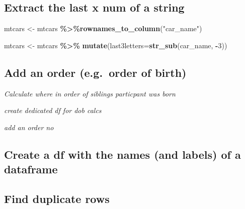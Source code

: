 \documentclass[
]{article}
\newenvironment{Shaded}{\begin{snugshade}}{\end{snugshade}}
\newcommand{\AttributeTok}[1]{\textcolor[rgb]{0.13,0.29,0.53}{#1}}
\newcommand{\CommentTok}[1]{\textcolor[rgb]{0.56,0.35,0.01}{\textit{#1}}}
\newcommand{\DecValTok}[1]{\textcolor[rgb]{0.00,0.00,0.81}{#1}}
\newcommand{\FunctionTok}[1]{\textcolor[rgb]{0.13,0.29,0.53}{\textbf{#1}}}
\newcommand{\NormalTok}[1]{#1}
\newcommand{\OtherTok}[1]{\textcolor[rgb]{0.56,0.35,0.01}{#1}}
\newcommand{\SpecialCharTok}[1]{\textcolor[rgb]{0.81,0.36,0.00}{\textbf{#1}}}
\newcommand{\StringTok}[1]{\textcolor[rgb]{0.31,0.60,0.02}{#1}}
\begin{document}
\hypertarget{extract-the-last-x-num-of-a-string}{%
\subsection{Extract the last x num of a string}\label{extract-the-last-x-num-of-a-string}}

\begin{Shaded}
\begin{Highlighting}[]
\NormalTok{mtcars }\OtherTok{\textless{}{-}}\NormalTok{ mtcars }\SpecialCharTok{\%\textgreater{}\%}\FunctionTok{rownames\_to\_column}\NormalTok{(}\StringTok{"car\_name"}\NormalTok{)}

\NormalTok{mtcars }\OtherTok{\textless{}{-}}\NormalTok{ mtcars }\SpecialCharTok{\%\textgreater{}\%} \FunctionTok{mutate}\NormalTok{(}\AttributeTok{last3letters=}\FunctionTok{str\_sub}\NormalTok{(car\_name, }\SpecialCharTok{{-}}\DecValTok{3}\NormalTok{))}
\end{Highlighting}
\end{Shaded}

\hypertarget{add-an-order-e.g.-order-of-birth}{%
\subsection{Add an order (e.g.~order of birth)}\label{add-an-order-e.g.-order-of-birth}}

\emph{Calculate where in order of siblings particpant was born}

\emph{create dedicated df for dob calcs}

\emph{add an order no}

\hypertarget{create-a-df-with-the-names-and-labels-of-a-dataframe}{%
\subsection{Create a df with the names (and labels) of a dataframe}\label{create-a-df-with-the-names-and-labels-of-a-dataframe}}

\hypertarget{find-duplicate-rows}{%
\subsection{Find duplicate rows}\label{find-duplicate-rows}}

\begin{Shaded}
\end{Shaded}
\end{document}
